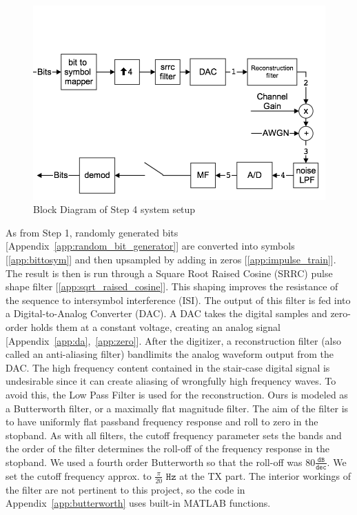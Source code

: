 \documentclass[]{article}
\begin{document}
\begin{figure}[H]
\centering
\includegraphics[width=\textwidth]{step4.png}
\caption{Block Diagram of Step 4 system setup\label{fig:step4}}
\end{figure}

As from Step 1, randomly generated bits [Appendix~\ref{app:random_bit_generator}] are converted into symbols [\ref{app:bittosym}] and then upsampled by adding in zeros [\ref{app:impulse_train}].  The result is then is run through a Square Root Raised Cosine (SRRC) pulse shape filter [\ref{app:sqrt_raised_cosine}].  This shaping improves the resistance of the sequence to intersymbol interference (ISI).  The output of this filter is fed into a Digital-to-Analog Converter (DAC).  A DAC takes the digital samples and zero-order holds them at a constant voltage, creating an analog signal [Appendix~\ref{app:da},~\ref{app:zero}]. After the digitizer, a reconstruction filter (also called an anti-aliasing filter) bandlimits the analog waveform output from the DAC.  The high frequency content contained in the stair-case digital signal is undesirable since it can create aliasing of wrongfully high frequency waves. To avoid this, the Low Pass Filter is used for the reconstruction.  Ours is modeled as a Butterworth filter, or a maximally flat magnitude filter.  The aim of the filter is to have uniformly flat passband frequency response and roll to zero in the stopband.  As with all filters, the cutoff frequency parameter sets the bands and the order of the filter determines the roll-off of the frequency response in the stopband.  We used a fourth order Butterworth so that the roll-off was $80 \mathtt{\frac{dB}{dec}}$.  We set the cutoff frequency approx. to $\frac{\pi}{20}$ $\mathtt{Hz}$ at the TX part. The interior workings of the filter are not pertinent to this project, so the code in Appendix~\ref{app:butterworth} uses built-in MATLAB functions.  \\
\end{document}
